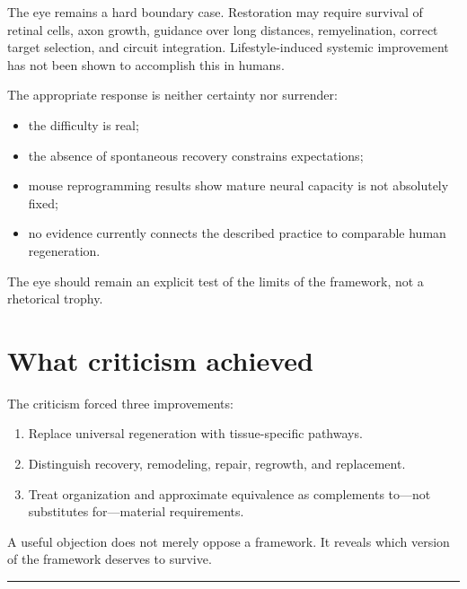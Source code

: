 The eye remains a hard boundary case. Restoration may require survival of retinal cells, axon growth, guidance over long distances, remyelination, correct target selection, and circuit integration. Lifestyle-induced systemic improvement has not been shown to accomplish this in humans.

The appropriate response is neither certainty nor surrender:

\begin{itemize}
\tightlist
\item
  the difficulty is real;
\item
  the absence of spontaneous recovery constrains expectations;
\item
  mouse reprogramming results show mature neural capacity is not absolutely fixed;
\item
  no evidence currently connects the described practice to comparable human regeneration.
\end{itemize}

The eye should remain an explicit test of the limits of the framework, not a rhetorical trophy.

\section{What criticism achieved}

The criticism forced three improvements:

\begin{enumerate}
\def\labelenumi{\arabic{enumi}.}
\tightlist
\item
  Replace universal regeneration with tissue-specific pathways.
\item
  Distinguish recovery, remodeling, repair, regrowth, and replacement.
\item
  Treat organization and approximate equivalence as complements to---not substitutes for---material requirements.
\end{enumerate}

A useful objection does not merely oppose a framework. It reveals which version of the framework deserves to survive.

\begin{center}\rule{0.5\linewidth}{0.5pt}\end{center}
